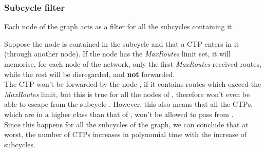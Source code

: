 \documentclass[a4paper]{article}
\begin{document}
\subsubsection{Subcycle filter}
Each node of the graph acts as a filter for all the subcycles containing it.

Suppose the node  is contained in the subcycle  and that a CTP 
enters in it (through another node).
If the node  has the \emph{MaxRoutes} limit set, it will memorise, for each
node of the network, only the first \emph{MaxRoutes} received routes, while the
rest will be disregarded, and \textbf{not} forwarded. \\
The CTP  won't be forwarded by the node , if it contains routes which
exceed the \emph{MaxRoutes} limit, but this is true for all the nodes of
, therefore  won't even be able to escape from the subcycle
. However, this also means that all the CTPs, which are in a higher
class than that of , won't be allowed to pass from .\\

Since this happens for all the subcycles of the graph, we can conclude that at
worst, the number of CTPs increases in polynomial time with the increase of
subcycles.
\end{document}
